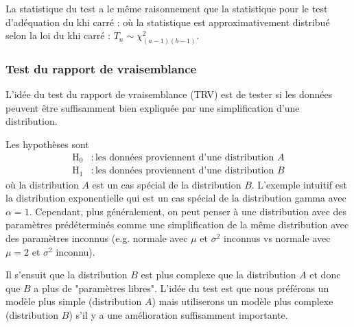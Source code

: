 \documentclass[french]{article}
\begin{document}
\begin{multicols*}{2}
\begin{definitionNOHFILL}
\bigskip

La statistique du test a le même raisonnement que la statistique pour le test d'adéquation du khi carré :  où la statistique est approximativement distribué selon la loi du khi carré : $T_{n} \sim \chi^{2}_{(a - 1)(b - 1)}$. 

\end{definitionNOHFILL}



\columnbreak
\subsubsection{Test du rapport de vraisemblance}
\begin{rappel_enhanced}[Motivation]
L'idée du test du rapport de vraisemblance (TRV) est de tester si les données peuvent être suffisamment bien expliquée par une simplification d'une distribution. 
\end{rappel_enhanced}

\begin{definitionNOHFILL}
Les hypothèses sont 
\begin{align*}
	\textrm{H}_{0}	&:	\text{les données proviennent d'une distribution $A$}	\\
	\textrm{H}_{1}	&:	\text{les données proviennent d'une distribution $B$}
\end{align*}
où la distribution $A$ est un cas spécial de la distribution $B$. L'exemple intuitif est la distribution exponentielle qui est un cas spécial de la distribution gamma avec $\alpha = 1$. Cependant, plus généralement, on peut penser à une distribution avec des paramètres prédéterminés comme une simplification de la même distribution avec des paramètres inconnus (e.g. normale avec $\mu$ et $\sigma^{2}$ inconnus vs normale avec $\mu = 2$ et $\sigma^{2}$ inconnu).

\bigskip

Il s'ensuit que la distribution $B$ est plus complexe que la distribution $A$ et donc que $B$ a plus de "paramètres libres". L'idée du test est que nous préférons un modèle plus simple (distribution $A$) mais utiliserons un modèle plus complexe (distribution $B$) s'il y a une amélioration suffisamment importante.

\bigskip


\end{definitionNOHFILL}
\end{multicols*}
\end{document}
